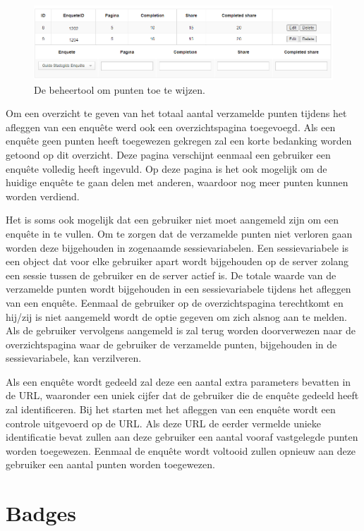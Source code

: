 \begin{figure}
    \includegraphics[width=\linewidth]{ManagePoints.png}
    \caption{De beheertool om punten toe te wijzen.}
    \label{fig:managepoints}
\end{figure}

Om een overzicht te geven van het totaal aantal verzamelde punten tijdens het afleggen van een enquête werd ook een overzichtspagina toegevoegd. Als een enquête geen punten heeft toegewezen gekregen zal een korte bedanking worden getoond op dit overzicht. Deze pagina verschijnt eenmaal een gebruiker een enquête volledig heeft ingevuld. Op deze pagina is het ook mogelijk om de huidige enquête te gaan delen met anderen, waardoor nog meer punten kunnen worden verdiend.

Het is soms ook mogelijk dat een gebruiker niet moet aangemeld zijn om een enquête in te vullen. Om te zorgen dat de verzamelde punten niet verloren gaan worden deze bijgehouden in zogenaamde sessievariabelen. Een sessievariabele is een object dat voor elke gebruiker apart wordt bijgehouden op de server zolang een sessie tussen de gebruiker en de server actief is. De totale waarde van de verzamelde punten wordt bijgehouden in een sessievariabele tijdens het afleggen van een enquête. Eenmaal de gebruiker op de overzichtspagina terechtkomt en hij/zij is niet aangemeld wordt de optie gegeven om zich alsnog aan te melden. Als de gebruiker vervolgens aangemeld is zal terug worden doorverwezen naar de overzichtspagina waar de gebruiker de verzamelde punten, bijgehouden in de sessievariabele, kan verzilveren.

Als een enquête wordt gedeeld zal deze een aantal extra parameters bevatten in de URL, waaronder een uniek cijfer dat de gebruiker die de enquête gedeeld heeft zal identificeren. Bij het starten met het afleggen van een enquête wordt een controle uitgevoerd op de URL. Als deze URL de eerder vermelde unieke identificatie bevat zullen aan deze gebruiker een aantal vooraf vastgelegde punten worden toegewezen. Eenmaal de enquête wordt voltooid zullen opnieuw aan deze gebruiker een aantal punten worden toegewezen.

\section{Badges}

